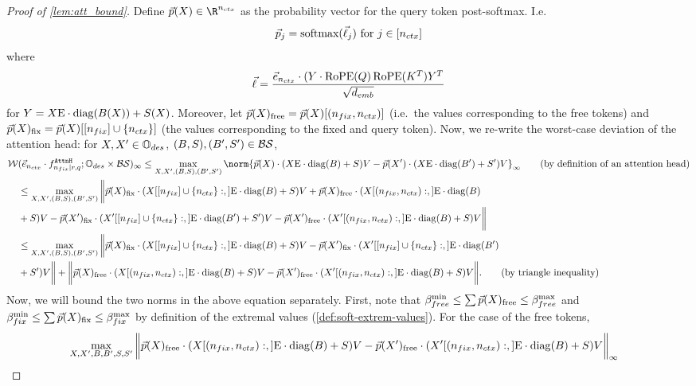 \begin{proof}[Proof of \cref{lem:att_bound}]
	\label{proof:att_bound}
	Define $\vec{p}(X) \in \R^{\nctx}$ as the probability vector for the query token post-softmax.
	I.e.
	\[
		\vec{p}_j = \text{softmax}(\vec{\ell}_j) \text{ for } j \in [{n_{ctx}}]
	\]
	where \[
		\vec{\ell} = \frac{\vec{e}_{{n_{ctx}}} \cdot(Y \cdot \operatorname{RoPE}(Q) \operatorname{RoPE}(K^T) Y^T}{\sqrt{{d_{emb}}}}
	\]
	for $Y = X \text{E} \cdot \mathrm{diag}(B(X)) + S(X)$.
	Moreover, let $\vec{p}(X)_{\text{free}} = \vec{p}(X)[(n_{fix}, {n_{ctx}})]$ (i.e.\ the values corresponding to the free tokens) and $\vec{p}(X)_{\text{fix}} = \vec{p}(X)[[n_{fix}] \cup \{{n_{ctx}}\}]$ (the values corresponding to the fixed and query token).
	Now, we re-write the worst-case deviation of the attention head: for $X, X' \in \mathbb{O}_{des}$, $(B, S), (B', S') \in \mathcal{B} \mathcal{S}$,
	\begin{align*}
		\WD&(\vecNctx \cdot f^{\attnH}_{\ndes \mid r, q} ; \InpSpace \times \blowupSet \shiftSet)_\infty
			\leq  \max_{X, X', (B, S), (B', S')} 
			\norm{\vec{p}(X) \cdot (X \Embed \cdot \diag(B) + S) V - \vec{p}(X') \cdot (X \Embed \cdot \diag(B') + S') V}_\infty \tag{by definition of an attention head} \\
		   &\leq \max_{X, X', (B, S), (B', S')} \bigg\|\vec{p}(X)_\fix \cdot (X[[\nfix] \cup \{\nctx\}:, ] \Embed \cdot \diag(B) + S) V + \vec{p}(X)_\free \cdot (X[(\nfix, \nctx):, ] \Embed \cdot \diag(B) \\ &+ S) V - \vec{p}(X')_\fix \cdot (X'[[\nfix] \cup \{\nctx\}:, ] \Embed \cdot \diag(B') + S') V - \vec{p}(X')_\free \cdot (X'[(\nfix, \nctx):, ] \Embed \cdot \diag(B) + S) V \bigg\| \\
		   &\leq \max_{X, X', (B, S), (B', S')} \bigg\|\vec{p}(X)_\fix \cdot (X[[\nfix] \cup \{\nctx\}:, ] \Embed \cdot \diag(B) + S) V - \vec{p}(X')_\fix \cdot (X'[[\nfix] \cup \{\nctx\}:, ] \Embed \cdot \diag(B') \\ &+ S') V\bigg\| + \bigg\|\vec{p}(X)_\free \cdot (X[(\nfix, \nctx):, ] \Embed \cdot \diag(B) + S) V - \vec{p}(X')_\free \cdot (X'[(\nfix, \nctx):, ] \Embed \cdot \diag(B) + S) V \bigg\|.
		   \tag{by triangle inequality} \\
	\end{align*}
	Now, we will bound the two norms in the above equation separately.
	First, note that ${\beta}_{free}^{\min} \leq \sum \vec{p}(X)_{\text{free}} \leq {\beta}_{free}^{\max}$ and ${\beta}_{fix}^{\min} \leq \sum \vec{p}(X)_{\text{fix}} \leq {\beta}_{fix}^{\max}$ by definition of the extremal values (\cref{def:soft-extrem-values}).
	For the case of the free tokens,
	\begin{align*}
		&\max_{X, X', B, B', S, S'} \bigg\|\vec{p}(X)_\free \cdot (X[(\nfix, \nctx):, ] \Embed \cdot \diag(B) + S) V - \vec{p}(X')_\free \cdot (X'[(\nfix, \nctx):, ] \Embed \cdot \diag(B) + S) V \bigg\|_\infty

\end{align*}
\end{proof}
